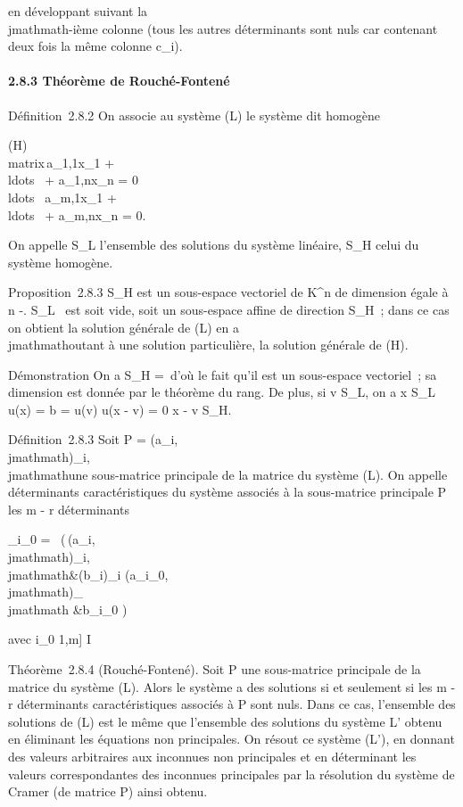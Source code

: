 \documentclass[]{article}
\begin{document}
en développant suivant la \\jmathmath-ième colonne (tous les autres déterminants
sont nuls car contenant deux fois la même colonne c_i).

\paragraph{2.8.3 Théorème de Rouché-Fontené}

Définition~2.8.2 On associe au système (L) le système dit homogène

(H)\quad \left
\\matrix\,a_1,1x_1
+ \\ldots~ +
a_1,nx_n = 0 \cr
\\ldots~
\cr a_m,1x_1 +
\\ldots~ +
a_m,nx_n = 0\right .

On appelle S_L l'ensemble des solutions du système linéaire,
S_H celui du système homogène.

Proposition~2.8.3 S_H est un sous-espace vectoriel de
K^n de dimension égale à n
-\mathrmrgL. S_L~
est soit vide, soit un sous-espace affine de direction S_H~;
dans ce cas on obtient la solution générale de (L) en a\\jmathmathoutant à une
solution particulière, la solution générale de (H).

Démonstration On a S_H =\
\mathrmKeru d'où le fait qu'il est un sous-espace
vectoriel~; sa dimension est donnée par le théorème du rang. De plus, si
v \in S_L, on a x \in S_L \Leftrightarrow
u(x) = b = u(v) \Leftrightarrow u(x - v) = 0
\Leftrightarrow x - v \in S_H.

Définition~2.8.3 Soit P = (a_i,\\jmathmath)_i\inI,\\jmathmath\inJ une
sous-matrice principale de la matrice du système (L). On appelle
déterminants caractéristiques du système associés à la sous-matrice
principale P les m - r déterminants

\Delta_i_0 =\
 \left
(\matrix\,(a_i,\\jmathmath)_i\inI,\\jmathmath\inJ&(b_i)_i\inI
\cr (a_i_0,\\jmathmath)_\\jmathmath\inJ
&b_i_0 \right )

avec i_0 \in {[}1,m{]} \diagdown I

Théorème~2.8.4 (Rouché-Fontené). Soit P une sous-matrice principale de
la matrice du système (L). Alors le système a des solutions si et
seulement si les m - r déterminants caractéristiques associés à P sont
nuls. Dans ce cas, l'ensemble des solutions de (L) est le même que
l'ensemble des solutions du système L' obtenu en éliminant les équations
non principales. On résout ce système (L'), en donnant des valeurs
arbitraires aux inconnues non principales et en déterminant les valeurs
correspondantes des inconnues principales par la résolution du système
de Cramer (de matrice P) ainsi obtenu.
\end{document}
